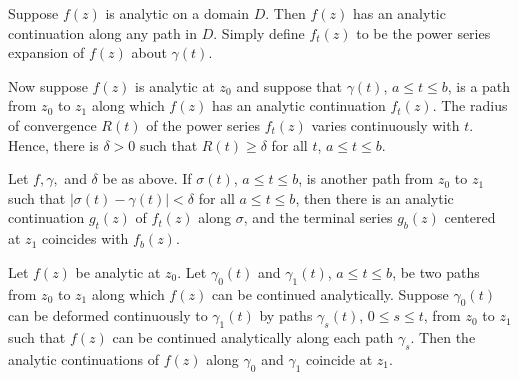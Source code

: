 \begin{example}
    Suppose $f(z)$ is analytic on a domain $D$. Then $f(z)$ has an analytic continuation along any path in $D$. Simply define $f_t(z)$ to be the power series expansion of $f(z)$ about $\gamma(t)$.
\end{example}

Now suppose $f(z)$ is analytic at $z_0$ and suppose that $\gamma(t)$, $a \leq t \leq b$, is a path from $z_0$ to $z_1$ along which $f(z)$ has an analytic continuation $f_t(z)$. The radius of convergence $R(t)$ of the power series $f_t(z)$ varies continuously with $t$. Hence, there is $\delta > 0$ such that $R(t) \geq \delta$ for all $t$, $a \leq t \leq b$.

\begin{lemma}
    Let $f,\gamma,$ and $\delta$ be as above. If $\sigma(t)$, $a \leq t \leq b$, is another path from $z_0$ to $z_1$ such that $|\sigma(t) - \gamma(t)| < \delta$ for all $a \leq t \leq b$, then there is an analytic continuation $g_t(z)$ of $f_t(z)$ along $\sigma$, and the terminal series $g_b(z)$ centered at $z_1$ coincides with $f_b(z)$.
\end{lemma}


\begin{theorem}
    Let $f(z)$ be analytic at $z_0$. Let $\gamma_0(t)$ and $\gamma_1(t)$, $a \leq t \leq b$, be two paths from $z_0$ to $z_1$ along which $f(z)$ can be continued analytically. Suppose $\gamma_0(t)$ can be deformed continuously to $\gamma_1(t)$ by paths $\gamma_s(t)$, $0\leq s \leq t$, from $z_0$ to $z_1$ such that $f(z)$ can be continued analytically along each path $\gamma_s$. Then the analytic continuations of $f(z)$ along $\gamma_0$ and $\gamma_1$ coincide at $z_1$.
\end{theorem}


